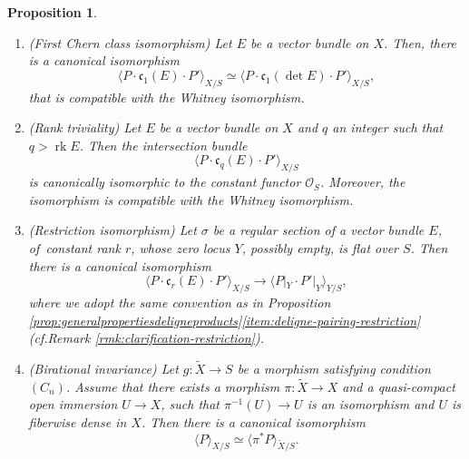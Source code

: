 \documentclass[11pt]{article}
\providecommand{\cf}{\textup{cf.}}
\theoremstyle{plain}
\newtheorem{proposition}[theorem]{Proposition}
\theoremstyle{definition}
\newcommand{\Ocal}{\mathcal O}
\newcommand{\cfrak}{\mathfrak c}
\DeclareMathOperator{\rk}{rk}
\begin{document}
\begin{proposition}
\begin{enumerate}
\item\label{item:first-chern-determinant} (First Chern class isomorphism) Let $E$ be a vector bundle on $X$. Then, there is a canonical isomorphism
\begin{displaymath}
\langle P\cdot \cfrak_{1}(E)\cdot P'\rangle_{X/S} \simeq \langle P\cdot \cfrak_{1}(\det E)\cdot P'\rangle_{X/S},
\end{displaymath}
that is compatible with the Whitney isomorphism.
\item \label{item:Chern-rank}(Rank triviality) Let $E$ be a vector bundle on $X$ and $q$ an integer such that $q > \rk E$. Then the intersection bundle
\begin{displaymath}
\langle P \cdot \cfrak_q(E) \cdot P' \rangle_{X/S}
\end{displaymath}
is canonically isomorphic to the constant functor $\Ocal_S$. Moreover, the isomorphism is compatible with the Whitney isomorphism.
\item\label{item:restriction-isomorphism} (Restriction isomorphism) Let $\sigma$ be a regular section of a vector bundle $E$, of~constant rank $r$, whose zero locus $Y$, possibly empty, is flat over $S$. Then there is a canonical isomorphism
\begin{displaymath}
\langle P \cdot \cfrak_{r}(E) \cdot P' \rangle_{X/S} \to \langle P|_Y \cdot P'|_Y \rangle_{Y/S},
\end{displaymath}
where we adopt the same convention as in Proposition \ref{prop:generalpropertiesdeligneproducts}\eqref{item:deligne-pairing-restriction} (\cf Remark \ref{rmk:clarification-restriction}).
\item \label{item:birational-invariance} (Birational invariance) Let $g: \widetilde{X} \to S$ be a morphism satisfying condition $(C_n)$. Assume that there exists a morphism $\pi\colon \widetilde{X} \to X$ and a quasi-compact open immersion $U \to X$, such that $\pi^{-1}(U) \to U$ is an isomorphism and $U$ is fiberwise dense in $X$.
Then there is a canonical isomorphism
\begin{displaymath}
\langle P \rangle_{X/S}\simeq \langle \pi^\ast P \rangle_{\widetilde{X}/S}.
\end{displaymath}
\end{enumerate}
\end{proposition}
\end{document}
